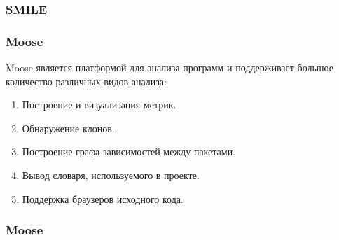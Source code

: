 \documentclass{beamer}
\begin{document}
\begin{frame}
\frametitle{SMILE}


\end{frame}

\begin{frame}
\frametitle{Moose}

Moose является платформой для анализа программ и поддерживает большое количество
различных видов анализа:

\begin{enumerate}
    \item Построение и визуализация метрик.
    \item Обнаружение клонов.
    \item Построение графа зависимостей между пакетами.
    \item Вывод словаря, используемого в проекте.
    \item Поддержка браузеров исходного кода.
\end{enumerate}

\end{frame}

\begin{frame}
\frametitle{Moose}


\end{frame}
\end{document}
